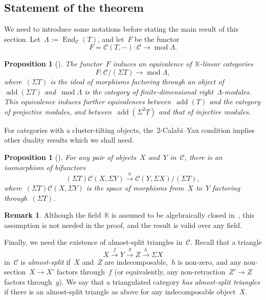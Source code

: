 \documentclass{amsart}
\newtheorem{proposition}[theorem]{Proposition}
\theoremstyle{definition}
\newtheorem{remark}[theorem]{Remark}
\newcommand{\darkblue}{\color{darkblue}} %
\newcommand{\defn}[1]{\textsl{\darkblue #1}} %
\newcommand{\field}{\mathbb{K}}
\newcommand{\cat}{\mathcal{C}}
\newcommand{\susp}{\Sigma}
\newcommand{\add}{\operatorname{add}}
\newcommand{\MOD}{\operatorname{mod}}
\newcommand{\End}[1]{\operatorname{End}_{#1}}
\begin{document}

\subsection{Statement of the theorem}
We need to introduce some notations before stating the main result of this section.  Let~$\Lambda:= \End{\cat}(T)$, and let~$F$ be the functor
\[
 F=\cat(T,-):\cat \xrightarrow{} \MOD \Lambda.
\]
\begin{proposition}[\cite{BuanMarshReiten, KellerReiten}]
 The functor~$F$ induces an equivalence of~$\field$-linear categories
 \[
  F:\cat/(\susp T) \xrightarrow{} \MOD \Lambda,
 \]
 where~$(\susp T)$ is the ideal of morphisms factoring through an object of~$\add(\susp T)$ and~$\MOD \Lambda$ is the category of finite-dimensional right~$\Lambda$-modules.  This equivalence induces further equivalences between~$\add(T)$ and the category of projective modules, and between~$\add(\susp^2 T)$ and that of injective modules.
\end{proposition}

For categories with a cluster-tilting objects, the~$2$-Calabi--Yau condition implies other duality results which we shall need.

\begin{proposition}[\cite{Palu}]
 For any pair of objects~$X$ and~$Y$ in~$\cat$, there is an isomorphism of bifunctors
 \[
  (\susp T)\cat(X, \susp Y) \xrightarrow{\cong} \cat(Y, \susp X)/(\susp T),
 \]
 where~$(\susp T)\cat(X, \susp Y)$ is the space of morphisms from~$X$ to~$Y$ factoring through~$(\susp T)$.
\end{proposition}

\begin{remark}
 Although the field~$\field$ is assumed to be algebraically closed in~\cite{Palu}, this assumption is not needed in the proof, and the result is valid over any field.
\end{remark}

Finally, we need the existence of almost-split triangles in~$\cat$.  Recall that a triangle
\[
 X\xrightarrow{f} Y \xrightarrow{g} Z \xrightarrow{h} \susp X
\]
in~$\cat$ is \defn{almost-split} if~$X$ and~$Z$ are indecomposable,~$h$ is non-zero, and any non-section~$X\to X'$ factors through~$f$  (or equivalently, any non-retraction~$Z'\to Z$ factors through~$g$).  We say that a triangulated category \defn{has almost-split triangles} if there is an almost-split triangle as above for any indecomposable object~$X$. 
\end{document}
